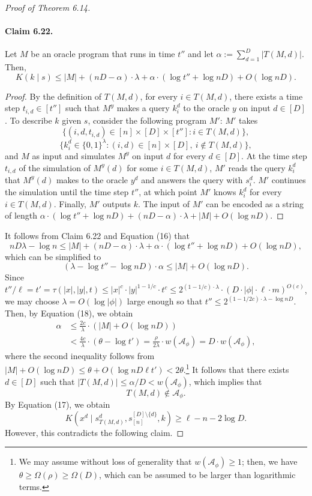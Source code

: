 \documentclass[10pt,a4paper]{article}
\begin{document}
\begin{proof}[Proof of Theorem 6.14]
\paragraph{Claim 6.22.}
Let $M$ be an oracle program that runs in time $t''$ and let $\alpha:=\sum_{d=1}^D|T(M,d)|$. Then,
\[K(k\mid s)\leq|M|+(nD-\alpha)\cdot\lambda+\alpha\cdot(\log t''+\log nD)+O(\log nD).\]
\begin{proof}
By the definition of $T(M,d)$, for every $i\in T(M,d)$, there exists a time step $t_{i,d}\in[t'']$ such that $M^y$ makes a query $k_i^d$ to the oracle $y$ on input $d\in[D]$. To describe $k$ given $s$, consider the following program $M'$: $M'$ takes
\[\{(i,d,t_{i,d})\in[n]\times[D]\times[t'']:i\in T(M,d)\},\]
\[\{k_i^d\in\{0,1\}^\lambda:(i,d)\in[n]\times[D],\ i\notin T(M,d)\},\]
and $M$ as input and simulates $M^y$ on input $d$ for every $d\in[D]$. At the time step $t_{i,d}$ of the simulation of $M^y(d)$ for some $i\in T(M,d)$, $M'$ reads the query $k_i^d$ that $M^y(d)$ makes to the oracle $y^d$ and answers the query with $s_i^d$. $M'$ continues the simulation until the time step $t''$, at which point $M'$ knows $k_i^d$ for every $i\in T(M,d)$. Finally, $M'$ outputs $k$. The input of $M'$ can be encoded as a string of length $\alpha\cdot(\log t''+\log nD)+(nD-\alpha)\cdot\lambda+|M|+O(\log nD)$.
\end{proof}
It follows from Claim 6.22 and Equation (16) that
\[nD\lambda-\log n\leq|M|+(nD-\alpha)\cdot\lambda+\alpha\cdot(\log t''+\log nD)+O(\log nD),\]
which can be simplified to
\[(\lambda-\log t''-\log nD)\cdot\alpha\leq|M|+O(\log nD).\tag{18}\]
Since $t''/\ell=t'=\tau(|x|,|y|,t)\leq|x|^c\cdot|y|^{1-1/c}\cdot t^c\leq2^{(1-1/c)\cdot\lambda}\cdot(D\cdot|\phi|\cdot\ell\cdot m)^{O(c)}$, we may choose $\lambda=O(\log|\phi|)$ large enough so that $t''\leq2^{(1-1/2c)\cdot\lambda-\log nD}$. Then, by Equation (18), we obtain
\begin{align*}
\alpha&\leq\frac{2c}{\lambda}\cdot(|M|+O(\log nD))\\
&<\frac{4c}{\lambda}\cdot(\theta-\log t')=\frac\rho{2\lambda}\cdot w(\mathcal A_\phi)=D\cdot w(\mathcal A_\phi),
\end{align*}
where the second inequality follows from $|M|+O(\log nD)\leq\theta+O(\log nD\ell t')<2\theta$.\footnote{We may assume without loss of generality that $w(\mathcal A_\phi)\geq1$; then, we have $\theta\geq\Omega(\rho)\geq\Omega(D)$, which can be assumed to be larger than logarithmic terms.} It follows that there exists $d\in[D]$ such that $|T(M,d)|\leq\alpha/D<w(\mathcal A_\phi)$, which implies that
\[T(M,d)\notin\mathcal A_\phi.\]
By Equation (17), we obtain
\[K(x^d\mid s_{T(M,d)}^d,s_{[n]}^{[D]\setminus\{d\}},k)\geq\ell-n-2\log D.\]
However, this contradicts the following claim.

\end{proof}
\end{document}
